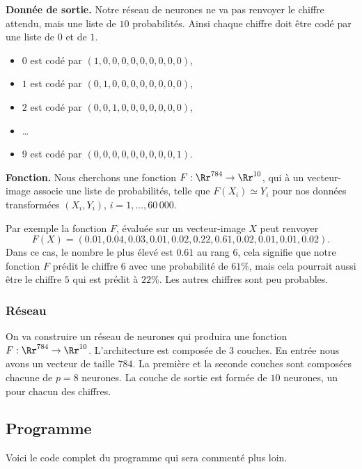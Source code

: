 \documentclass[11pt,class=report,crop=false]{standalone}
\begin{document}
\textbf{Donnée de sortie.} Notre réseau de neurones ne va pas renvoyer le chiffre attendu, mais une liste de $10$ probabilités. Ainsi chaque chiffre doit être codé par une liste de $0$ et de $1$.
\begin{itemize}
  \item $0$ est codé par $(1,0,0,0,0,0,0,0,0,0)$,
  \item $1$ est codé par $(0,1,0,0,0,0,0,0,0,0)$, 
  \item $2$ est codé par $(0,0,1,0,0,0,0,0,0,0)$, 
  \item \ldots
  \item $9$ est codé par $(0,0,0,0,0,0,0,0,0,1)$.
\end{itemize}

\bigskip

\textbf{Fonction.}
Nous cherchons une fonction $F : \Rr^{784} \to \Rr^{10}$, qui à un vecteur-image associe une liste de probabilités, telle que 
$F(X_i) \simeq Y_i$ pour nos données transformées $(X_i,Y_i)$, $i=1,\ldots,60\,000$.

Par exemple la fonction $F$, évaluée sur un vecteur-image $X$ peut renvoyer
$$F(X) = (0.01, 0.04, 0.03, 0.01, 0.02, 0.22, 0.61, 0.02, 0.01, 0.01, 0.02).$$
Dans ce cas, le nombre le plus élevé est $0.61$ au rang $6$, cela signifie que notre fonction $F$ prédit le chiffre $6$ avec une probabilité de $61\%$, mais cela pourrait aussi être le chiffre $5$ qui est prédit à $22\%$. Les autres chiffres sont peu probables.



\subsubsection*{Réseau}

On va construire un réseau de neurones qui produira une fonction $F : \Rr^{784} \to \Rr^{10}$. L'architecture est composée de $3$ couches. En entrée nous avons un vecteur de taille $784$. La première et la seconde couches sont composées chacune de $p=8$ neurones. La couche de sortie est formée de $10$ neurones, un pour chacun des chiffres.


\subsection{Programme}

Voici le code complet du programme qui sera commenté plus loin.
\end{document}
